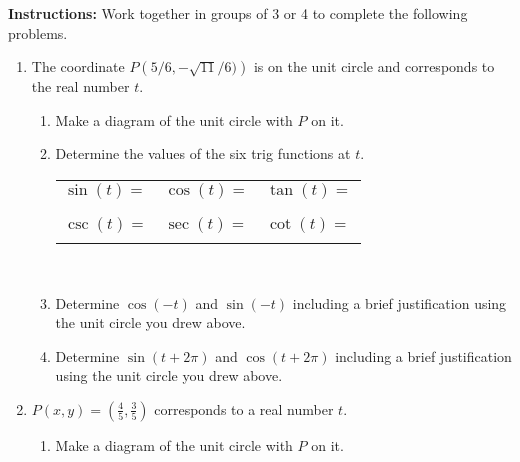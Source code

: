 




\noindent \textbf{Instructions:}  Work together in groups of  3 or 4 to complete the following problems.\\


\begin{enumerate}


\item The coordinate $P\left(5/6,-\sqrt{11}/6)\right)$ is on the unit circle and corresponds to
  the real number $t$.

\begin{enumerate}
\item Make a diagram of the unit circle with $P$ on it.

  \vfill
  \vfill

\item Determine the values of the six trig functions at $t$. 

\begin{tabular}{l l l }
$\sin(t)=$\phantom{sldkfjdlkdlkjfl}&  $\cos(t)=$\phantom{sldkfjdlkdlkjfl}& $\tan(t)=$\phantom{sldkfjdlkdlkjfl}    \\
& & \\
& & \\
$\csc(t)=$ &  $\sec(t)=$   & $\cot(t)=$    \\
& & \\

\end{tabular}\\


\item Determine $\cos(-t)$ and $\sin(-t)$ including a brief
  justification using the unit circle you drew above.

  \vfill

\item Determine $\sin(t+2\pi)$ and $\cos(t+2\pi)$ including a brief
  justification using the unit circle you drew above.

  \vfill

\end{enumerate}

\clearpage

\item $P(x,y) = \left(\frac{4}{5}, \frac{3}{5}\right)$ corresponds to a real number $t$. 
\begin{enumerate}
\item Make a diagram of the unit circle with $P$ on it.


\end{enumerate}
\end{enumerate}
